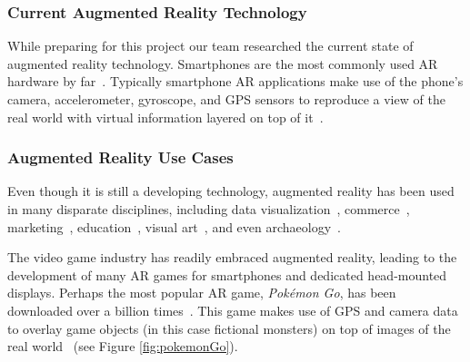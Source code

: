 \documentclass[a4paper, 10pt, american, titlepage]{article}
\begin{document}
\subsubsection{Current Augmented Reality Technology}
\label{sec:currentAugmentedRealityTechnology}

While preparing for this project our team researched the current state of
augmented reality technology. Smartphones are the most commonly used AR hardware
by far~\autocite{boland2018}. Typically smartphone AR applications make use of
the phone's camera, accelerometer, gyroscope, and GPS sensors to reproduce a
view of the real world with virtual information layered on top of
it~\autocite{bonsor2018}.

\subsubsection{Augmented Reality Use Cases}
\label{sec:augmentedRealityUseCases}

Even though it is still a developing technology, augmented reality has been used
in many disparate disciplines, including data
visualization~\autocite{resnick2017}, commerce~\autocite{matney2018},
marketing~\autocite{sharma2015}, education~\autocite{stewart-smith2012}, visual
art~\autocite{katz2018}, and even archaeology~\autocite{eve2012}.

The video game industry has readily embraced augmented reality, leading to the
development of many AR games for smartphones and dedicated head-mounted
displays. Perhaps the most popular AR game, \textit{Pokémon Go}, has been
downloaded over a billion times~\autocite{webster2018}. This game makes use of
GPS and camera data to overlay game objects (in this case fictional monsters) on
top of images of the real world~\autocite{concepcion2016} (see Figure
\ref{fig:pokemonGo}).
\end{document}
